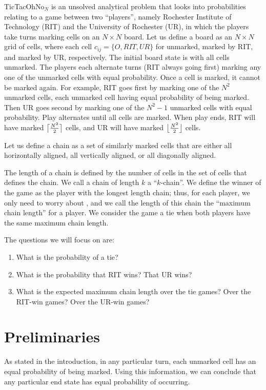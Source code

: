 \documentclass[12pt]{article}
\DeclarePairedDelimiter{\ceil}{\lceil}{\rceil}
\DeclarePairedDelimiter{\floor}{\lfloor}{\rfloor}
\theoremstyle{definition}
\theoremstyle{theorem}
\begin{document}
TicTacOhNo$_N$ is an unsolved analytical problem that looks into probabilities relating to a game between two ``players'', namely Rochester Institute of Technology (RIT) and the University of Rochester (UR), in which the players take turns marking cells on an $N \times N$ board. Let us define a board as an $N \times N$ grid of cells, where each cell $c_{ij} = \{O, RIT, UR\}$ for unmarked, marked by RIT, and marked by UR, respectively. The initial board state is with all cells unmarked. The players each alternate turns (RIT always going first) marking any one of the unmarked cells with equal probability. Once a cell is marked, it cannot be marked again. For example, RIT goes first by marking one of the $N^2$ unmarked cells, each unmarked cell having equal probability of being marked. Then UR goes second by marking one of the $N^2-1$ unmarked cells with equal probability. Play alternates until all cells are marked. When play ends, RIT will have marked $\ceil[\big]{\frac{N^2}{2}}$ cells, and UR will have marked $\floor[\big]{\frac{N^2}{2}}$ cells.

Let us define a chain as a set of similarly marked cells that are either all horizontally aligned, all vertically aligned, or all diagonally aligned.


The length of a chain is defined by the number of cells in the set of cells that defines the chain. We call a chain of length $k$ a ``$k$-chain''. We define the winner of the game as the player with the longest length chain; thus, for each player, we only need to worry about , and we call the length of this chain the ``maximum chain length'' for a player. We consider the game a tie when both players have the same maximum chain length.

The questions we will focus on are:
\begin{enumerate}
\item What is the probability of a tie?
\item What is the probability that RIT wins? That UR wins?
\item What is the expected maximum chain length over the tie games? Over the RIT-win games? Over the UR-win games?
\end{enumerate}

\section{Preliminaries}

As stated in the introduction, in any particular turn, each unmarked cell has an equal probability of being marked. Using this information, we can conclude that any particular end state has equal probability of occurring.
\end{document}
